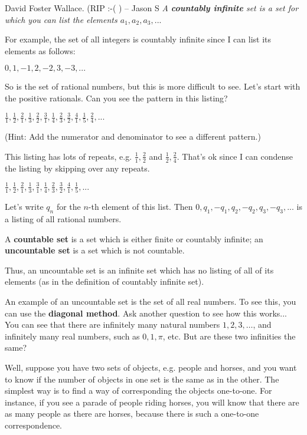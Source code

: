 David Foster Wallace. (RIP :-( ) – Jason S
\em
\es
\bs
A \textbf{countably infinite} set is a set for which you can list
the elements $a_1,a_2,a_3,...$

For example, the set of all integers is countably infinite since I
can list its elements as follows: 

$0,1,-1,2,-2,3,-3,...$ 

So is the set of rational numbers, but this is more difficult to see.
Let's start with the positive rationals. Can you see the pattern in
this listing?

$\frac{1}{1},\frac{1}{2},\frac{2}{1},\frac{1}{3},\frac{2}{2},\frac{3}{1},\frac{1}{4},\frac{2}{3},\frac{3}{2},\frac{4}{1},\frac{1}{5},\frac{2}{4},...$

(Hint: Add the numerator and denominator to see a different pattern.) 

This listing has lots of repeats, e.g. $\frac{1}{1}, \frac{2}{2}$
and $\frac{1}{2}, \frac{2}{4}$. That's ok since I can condense the
listing by skipping over any repeats.

$\frac{1}{1},\frac{1}{2},\frac{2}{1},\frac{1}{3},\frac{3}{1},\frac{1}{4},\frac{2}{3},\frac{3}{2},\frac{4}{1},\frac{1}{5},...$

Let's write $q_n$ for the $n$-th element of this list. Then $0,q_1,-q_1,q_2,-q_2,q_3,-q_3,...$
is a listing of all rational numbers.

A \textbf{countable set} is a set which is either finite or countably
infinite; an \textbf{uncountable set} is a set which is not countable.

Thus, an uncountable set is an infinite set which has no listing of
all of its elements (as in the definition of countably infinite set).

An example of an uncountable set is the set of all real numbers. To
see this, you can use the \textbf{diagonal method}. Ask another question
to see how this works...
\es
\bs
You can see that there are infinitely many natural numbers $1, 2, 3, \ldots$, 
and infinitely many real numbers, such as $0, 1, \pi$, etc. 
But are these two infinities the same?

Well, suppose you have two sets of objects, e.g. people and horses, 
and you want to know if the number of objects in one set is the same as in the other. 
The simplest way is to find a way of corresponding the objects one-to-one. 
For instance, if you see a parade of people riding horses, 
you will know that there are as many people as there are horses, 
because there is such a one-to-one correspondence.

